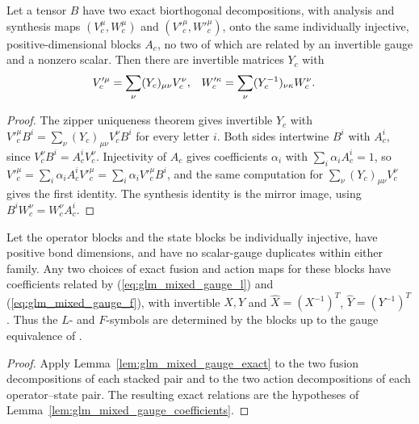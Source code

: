 \begin{lemma}
    \leanok
    \label{lem:glm_mixed_gauge_exact}
    Let a tensor $B$ have two exact biorthogonal decompositions, with
    analysis and synthesis maps $(V_c^\mu,W_c^\mu)$ and $(V'^{\mu}_c,W'^{\mu}_c)$,
    onto the same individually injective, positive-dimensional blocks $A_c$,
    no two of which are related by an invertible gauge and a nonzero scalar.
    Then there are invertible matrices $Y_c$ with
    \begin{align}
        V'^{\mu}_c    & =\sum_\nu(Y_c)_{\mu\nu}V^{\nu}_c,         &
        W'^{\kappa}_c & =\sum_\nu(Y_c^{-1})_{\nu\kappa}W^{\nu}_c.
        \notag
    \end{align}
\end{lemma}
\begin{proof}
    \leanok
    The zipper uniqueness theorem gives invertible $Y_c$ with
    $V'^{\mu}_cB^i=\sum_\nu(Y_c)_{\mu\nu}V^\nu_cB^i$ for every letter $i$.
    Both sides intertwine $B^i$ with $A_c^i$, since $V^\nu_cB^i=A_c^iV^\nu_c$.
    Injectivity of $A_c$ gives coefficients $\alpha_i$ with
    $\sum_i\alpha_iA_c^i=1$, so
    $V'^{\mu}_c=\sum_i\alpha_iA_c^iV'^{\mu}_c=\sum_i\alpha_iV'^{\mu}_cB^i$,
    and the same computation for $\sum_\nu(Y_c)_{\mu\nu}V_c^\nu$ gives the
    first identity. The synthesis identity is the mirror image, using
    $B^iW^\nu_c=W^\nu_cA_c^i$.
\end{proof}

\begin{theorem}
    \leanok
    \label{thm:glm_mixed_gauge_joint}
    Let the operator blocks and the state blocks be individually injective,
    have positive bond dimensions, and have no scalar-gauge duplicates within
    either family. Any two choices of exact fusion and action maps for these
    blocks have coefficients related by
    (\ref{eq:glm_mixed_gauge_l}) and (\ref{eq:glm_mixed_gauge_f}), with
    invertible $X,Y$ and $\widehat X=(X^{-1})^{T}$,
    $\widehat Y=(Y^{-1})^{T}$. Thus the $L$- and $F$-symbols are determined
    by the blocks up to the gauge equivalence of
    \cite[Section~3]{GarreRubio2023MPOSym}.
\end{theorem}
\begin{proof}
    \leanok
    Apply Lemma~\ref{lem:glm_mixed_gauge_exact} to the two fusion
    decompositions of each stacked pair and to the two action
    decompositions of each operator--state pair. The resulting exact
    relations are the hypotheses of
    Lemma~\ref{lem:glm_mixed_gauge_coefficients}.
\end{proof}

